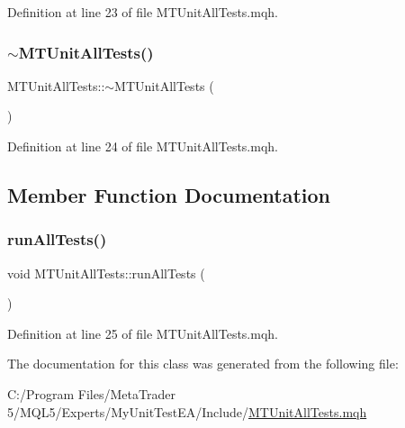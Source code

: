 Definition at line 23 of file M\+T\+Unit\+All\+Tests.\+mqh.

\mbox{\label{class_m_t_unit_all_tests_a2d9dccb31b2ce7cd3dc164c0c9c79c8c}} 
\subsubsection{\texorpdfstring{$\sim$\+M\+T\+Unit\+All\+Tests()}{~MTUnitAllTests()}}
{\footnotesize\ttfamily M\+T\+Unit\+All\+Tests\+::$\sim$\+M\+T\+Unit\+All\+Tests (\begin{DoxyParamCaption}{ }\end{DoxyParamCaption})\hspace{0.3cm}{\ttfamily [inline]}}



Definition at line 24 of file M\+T\+Unit\+All\+Tests.\+mqh.



\subsection{Member Function Documentation}
\mbox{\label{class_m_t_unit_all_tests_acb555e1d5ff6afa8a5fdbf097abe70f5}} 
\subsubsection{\texorpdfstring{run\+All\+Tests()}{runAllTests()}}
{\footnotesize\ttfamily void M\+T\+Unit\+All\+Tests\+::run\+All\+Tests (\begin{DoxyParamCaption}{ }\end{DoxyParamCaption})\hspace{0.3cm}{\ttfamily [inline]}}



Definition at line 25 of file M\+T\+Unit\+All\+Tests.\+mqh.



The documentation for this class was generated from the following file\+:\begin{DoxyCompactItemize}
\item 
C\+:/\+Program Files/\+Meta\+Trader 5/\+M\+Q\+L5/\+Experts/\+My\+Unit\+Test\+E\+A/\+Include/\mbox{\hyperlink{_m_t_unit_all_tests_8mqh}{M\+T\+Unit\+All\+Tests.\+mqh}}\end{DoxyCompactItemize}
